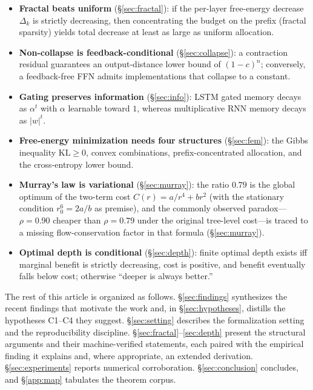 \documentclass[journal]{IEEEtran}
\begin{document}
\begin{itemize}
\item \textbf{Fractal beats uniform} (\S\ref{sec:fractal}): if the per-layer
free-energy decrease $\Delta_k$ is strictly decreasing, then concentrating the
budget on the prefix (fractal sparsity) yields total decrease at least as large
as uniform allocation.
\item \textbf{Non-collapse is feedback-conditional} (\S\ref{sec:collapse}): a
contraction residual guarantees an output-distance lower bound of
$(1-c)^n$; conversely, a feedback-free FFN admits implementations that collapse
to a constant.
\item \textbf{Gating preserves information} (\S\ref{sec:info}): LSTM gated
memory decays as $\alpha^t$ with $\alpha$ learnable toward $1$, whereas
multiplicative RNN memory decays as $|w|^t$.
\item \textbf{Free-energy minimization needs four structures}
(\S\ref{sec:fem}): the Gibbs inequality $\mathrm{KL}\ge0$, convex combinations,
prefix-concentrated allocation, and the cross-entropy lower bound.
\item \textbf{Murray's law is variational} (\S\ref{sec:murray}): the ratio
$0.79$ is the global optimum of the two-term cost $C(r)=a/r^4+br^2$ (with the
stationary condition $r_0^6=2a/b$ as premise), and the commonly observed
paradox---$\rho=0.90$ cheaper than $\rho=0.79$ under the original tree-level
cost---is traced to a missing flow-conservation factor in that formula
(\S\ref{sec:murray}).
\item \textbf{Optimal depth is conditional} (\S\ref{sec:depth}): finite optimal
depth exists iff marginal benefit is strictly decreasing, cost is positive, and
benefit eventually falls below cost; otherwise ``deeper is always better.''
\end{itemize}

The rest of this article is organized as follows. \S\ref{sec:findings}
synthesizes the recent findings that motivate the work and, in
\S\ref{sec:hypotheses}, distills the hypotheses C1--C4 they suggest.
\S\ref{sec:setting} describes the formalization setting and the
reproducibility discipline. \S\ref{sec:fractal}--\ref{sec:depth} present the
structural arguments and their machine-verified statements, each paired with
the empirical finding it explains and, where appropriate, an extended
derivation. \S\ref{sec:experiments} reports numerical corroboration.
\S\ref{sec:conclusion} concludes, and \S\ref{app:map} tabulates the theorem
corpus.
\end{document}
